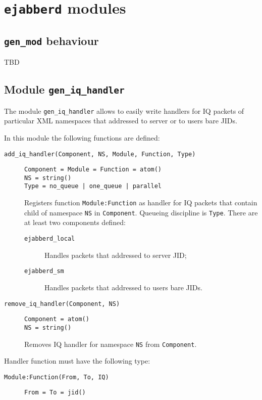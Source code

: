 \documentclass[10pt]{article}
\newcommand{\ejabberd}{\texttt{ejabberd}}
\begin{document}
\section{\ejabberd{} modules}
\label{sec:emods}


\subsection{\verb|gen_mod| behaviour}
\label{sec:genmod}

TBD

\subsection{Module \verb|gen_iq_handler|}
\label{sec:geniqhandl}

The module \verb|gen_iq_handler| allows to easily write handlers for IQ packets
of particular XML namespaces that addressed to server or to users bare JIDs.

In this module the following functions are defined:
\begin{description}
\item[\verb|add_iq_handler(Component, NS, Module, Function, Type)|]
\begin{verbatim}
Component = Module = Function = atom()
NS = string()
Type = no_queue | one_queue | parallel
\end{verbatim}
  Registers function \verb|Module:Function| as handler for IQ packets that
  contain child of namespace \verb|NS| in \verb|Component|.  Queueing
  discipline is \verb|Type|.  There are at least two components defined:
  \begin{description}
  \item[\verb|ejabberd_local|] Handles packets that addressed to server JID;
  \item[\verb|ejabberd_sm|] Handles packets that addressed to users bare JIDs.
  \end{description}
\item[\verb|remove_iq_handler(Component, NS)|]
\begin{verbatim}
Component = atom()
NS = string()
\end{verbatim}
  Removes IQ handler for namespace \verb|NS| from \verb|Component|.
\end{description}

Handler function must have the following type:
\begin{description}
\item[\verb|Module:Function(From, To, IQ)|]
\begin{verbatim}
From = To = jid()
\end{verbatim}
\end{description}
\end{document}
